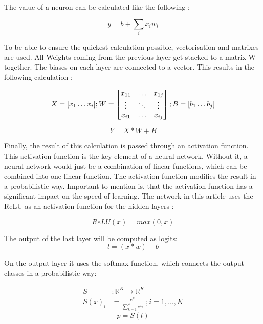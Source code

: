 The value of a neuron can be calculated like the following \cite{medium_nn_from_scratch}:

\begin{equation}
y = b + \sum_{i} x_i w_i
\end{equation}

To be able to ensure the quickest calculation possible, vectorisation and matrixes are used.
All Weights coming from the previous layer get stacked to a matrix W together.
The biases on each layer are connected to a vector.
This results in the following calculation
: \cite{medium_nn_from_scratch}

\begin{equation}
X = [ x_1 \dots x_i ]; \space W = 
\begin{bmatrix}
    x_{11} & \dots  & x_{1j} \\
    \vdots & \ddots & \vdots \\
    x_{i1} & \dots  & x_{ij}
\end{bmatrix}; \space
B = [ b_1 \dots b_j ]
\end{equation}

\begin{equation}
    Y = X * W + B
\end{equation}

Finally, the result of this calculation is passed through an activation function.
This activation function is the key element of a neural network.
Without it, a neural network would just be a combination of linear functions, which can be combined into one linear function.
The activation function modifies the result in a probabilistic way.
Important to mention is, that the activation function has a significant impact on the speed of learning.
The network in this article uses the ReLU as an activation function for the hidden layers \cite{math_nn_skalski,relu}:

\begin{equation}
    ReLU(x) = max(0,x)
\end{equation}

The output of the last layer will be computed as logits:
$$l = (x*w)+b$$

On the output layer it uses the softmax function, which connects the output classes in a probabilistic way:

\begin{equation}
    \begin{split}
        S & : \mathbb{R}^K \to \mathbb{R}^K
        \\
        S(x)_i & = \frac{e^{k_i}}{\sum_{k=1}^K e^{x_k}} \: ; i = 1, …, K
    \end{split}
\end{equation}
\begin{equation}
    p = S(l)
\end{equation}


